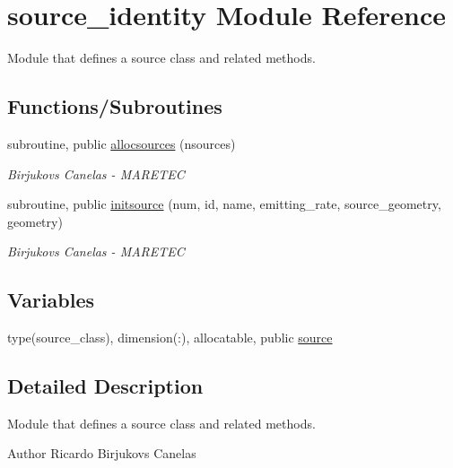 \hypertarget{namespacesource__identity}{}\section{source\+\_\+identity Module Reference}
\label{namespacesource__identity}


Module that defines a source class and related methods.  


\subsection*{Functions/\+Subroutines}
\begin{DoxyCompactItemize}
\item 
subroutine, public \mbox{\hyperlink{namespacesource__identity_a716b4cb4acec5756a6d4dcf20eee588e}{allocsources}} (nsources)
\begin{DoxyCompactList}\small\item\em Birjukovs Canelas -\/ M\+A\+R\+E\+T\+EC \end{DoxyCompactList}\item 
subroutine, public \mbox{\hyperlink{namespacesource__identity_a3939e59172252d0edce57e00ea41758d}{initsource}} (num, id, name, emitting\+\_\+rate, source\+\_\+geometry, geometry)
\begin{DoxyCompactList}\small\item\em Birjukovs Canelas -\/ M\+A\+R\+E\+T\+EC \end{DoxyCompactList}\end{DoxyCompactItemize}
\subsection*{Variables}
\begin{DoxyCompactItemize}
\item 
type(source\+\_\+class), dimension(\+:), allocatable, public \mbox{\hyperlink{namespacesource__identity_a5ed8006613af7461c6a2ff1cdaeb8f0f}{source}}
\end{DoxyCompactItemize}


\subsection{Detailed Description}
Module that defines a source class and related methods. 

\begin{DoxyAuthor}{Author}
Ricardo Birjukovs Canelas 
\end{DoxyAuthor}


